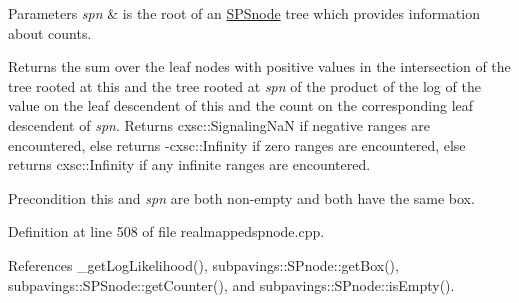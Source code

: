 \begin{DoxyParams}{\-Parameters}
{\em spn} & is the root of an \hyperlink{classsubpavings_1_1SPSnode}{\-S\-P\-Snode} tree which provides information about counts. \\
\hline
\end{DoxyParams}
\begin{DoxyReturn}{\-Returns}
the sum over the leaf nodes with positive values in the intersection of the tree rooted at this and the tree rooted at {\itshape spn\/} of the product of the log of the value on the leaf descendent of this and the count on the corresponding leaf descendent of {\itshape spn\/}. \-Returns cxsc\-::\-Signaling\-Na\-N if negative ranges are encountered, else returns -\/cxsc\-::\-Infinity if zero ranges are encountered, else returns cxsc\-::\-Infinity if any infinite ranges are encountered. 
\end{DoxyReturn}
\begin{DoxyPrecond}{\-Precondition}
this and {\itshape spn\/} are both non-\/empty and both have the same box. 
\end{DoxyPrecond}


\-Definition at line 508 of file realmappedspnode.\-cpp.



\-References \-\_\-get\-Log\-Likelihood(), subpavings\-::\-S\-Pnode\-::get\-Box(), subpavings\-::\-S\-P\-Snode\-::get\-Counter(), and subpavings\-::\-S\-Pnode\-::is\-Empty().


